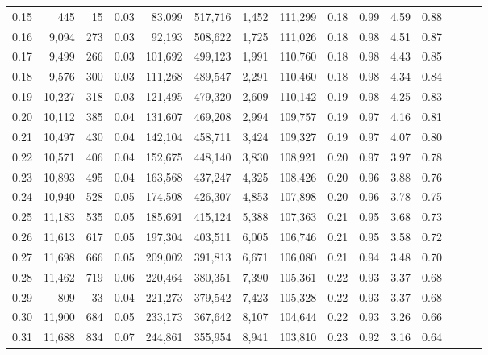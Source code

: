 \begin{tabular}{rrrrrrrrrrrrrrr}
0.15 &     445 &     15 &  0.03 &   83,099 &  517,716 &    1,452 &  111,299 &  0.18 &  0.99 &  4.59 &      0.88 \\
0.16 &   9,094 &    273 &  0.03 &   92,193 &  508,622 &    1,725 &  111,026 &  0.18 &  0.98 &  4.51 &      0.87 \\
0.17 &   9,499 &    266 &  0.03 &  101,692 &  499,123 &    1,991 &  110,760 &  0.18 &  0.98 &  4.43 &      0.85 \\
0.18 &   9,576 &    300 &  0.03 &  111,268 &  489,547 &    2,291 &  110,460 &  0.18 &  0.98 &  4.34 &      0.84 \\
0.19 &  10,227 &    318 &  0.03 &  121,495 &  479,320 &    2,609 &  110,142 &  0.19 &  0.98 &  4.25 &      0.83 \\
0.20 &  10,112 &    385 &  0.04 &  131,607 &  469,208 &    2,994 &  109,757 &  0.19 &  0.97 &  4.16 &      0.81 \\
0.21 &  10,497 &    430 &  0.04 &  142,104 &  458,711 &    3,424 &  109,327 &  0.19 &  0.97 &  4.07 &      0.80 \\
0.22 &  10,571 &    406 &  0.04 &  152,675 &  448,140 &    3,830 &  108,921 &  0.20 &  0.97 &  3.97 &      0.78 \\
0.23 &  10,893 &    495 &  0.04 &  163,568 &  437,247 &    4,325 &  108,426 &  0.20 &  0.96 &  3.88 &      0.76 \\
0.24 &  10,940 &    528 &  0.05 &  174,508 &  426,307 &    4,853 &  107,898 &  0.20 &  0.96 &  3.78 &      0.75 \\
0.25 &  11,183 &    535 &  0.05 &  185,691 &  415,124 &    5,388 &  107,363 &  0.21 &  0.95 &  3.68 &      0.73 \\
0.26 &  11,613 &    617 &  0.05 &  197,304 &  403,511 &    6,005 &  106,746 &  0.21 &  0.95 &  3.58 &      0.72 \\
0.27 &  11,698 &    666 &  0.05 &  209,002 &  391,813 &    6,671 &  106,080 &  0.21 &  0.94 &  3.48 &      0.70 \\
0.28 &  11,462 &    719 &  0.06 &  220,464 &  380,351 &    7,390 &  105,361 &  0.22 &  0.93 &  3.37 &      0.68 \\
0.29 &     809 &     33 &  0.04 &  221,273 &  379,542 &    7,423 &  105,328 &  0.22 &  0.93 &  3.37 &      0.68 \\
0.30 &  11,900 &    684 &  0.05 &  233,173 &  367,642 &    8,107 &  104,644 &  0.22 &  0.93 &  3.26 &      0.66 \\
0.31 &  11,688 &    834 &  0.07 &  244,861 &  355,954 &    8,941 &  103,810 &  0.23 &  0.92 &  3.16 &      0.64 \\

\end{tabular}
